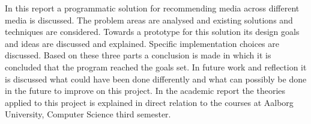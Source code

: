 In this report a programmatic solution for recommending media across different media is discussed. The problem areas are analysed and existing solutions and techniques are considered. Towards a prototype for this solution its design goals and ideas are discussed and explained. Specific implementation choices are discussed. Based on these three parts a conclusion is made in which it is concluded that the program reached the goals set. 
In future work and reflection it is discussed what could have been done differently and what can possibly be done in the future to improve on this project.
In the academic report the theories applied to this project is explained in direct relation to the courses at Aalborg University, Computer Science third semester.